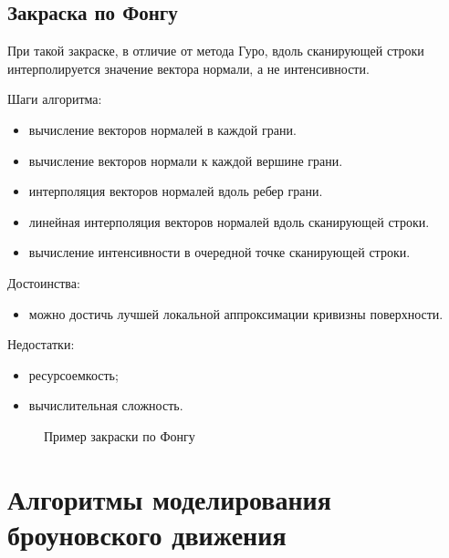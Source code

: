 \subsection{Закраска по Фонгу}

При такой закраске, в отличие от метода Гуро, вдоль сканирующей строки интерполируется значение вектора нормали, а не интенсивности. 

Шаги алгоритма:

\begin{itemize}
	\item вычисление векторов нормалей в каждой грани.
	\item вычисление векторов нормали к каждой вершине грани.
	\item интерполяция векторов нормалей вдоль ребер грани.
	\item линейная интерполяция векторов нормалей вдоль сканирующей строки.
	\item вычисление интенсивности в очередной точке сканирующей строки.
\end{itemize}

Достоинства:
\begin{itemize}
	\item можно достичь лучшей локальной аппроксимации кривизны поверхности.
\end{itemize}

Недостатки:
\begin{itemize}
	\item ресурсоемкость;
	\item вычислительная сложность.
\end{itemize}


\begin{figure}[ph!]
	\caption{Пример закраски по Фонгу}
	\label{fig:draw_phong}
\end{figure}

\section{Алгоритмы моделирования броуновского движения}

